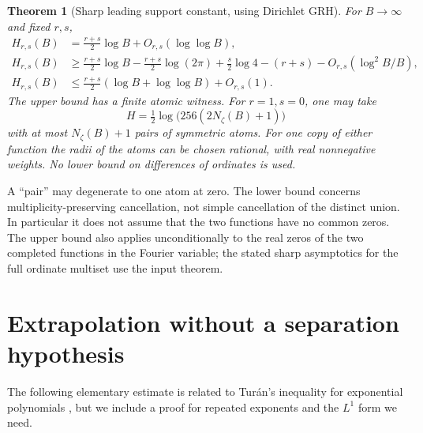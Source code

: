 \documentclass[11pt]{article}
\newtheorem{theorem}{Theorem}[section]
\theoremstyle{remark}\newtheorem{remark}[theorem]{Remark}
\begin{document}
\begin{theorem}[Sharp leading support constant, using Dirichlet GRH]\label{thm:main}
For $B\to\infty$ and fixed $r,s$,
\begin{align*}
 H_{r,s}(B)&=\frac{r+s}{2}\log B+O_{r,s}(\log\log B),\\
 H_{r,s}(B)&\ge \frac{r+s}{2}\log B-\frac{r+s}{2}\log(2\pi)
 +\frac{s}{2}\log4-(r+s)-O_{r,s}(\log^2 B/B),\\
 H_{r,s}(B)&\le\frac{r+s}{2}(\log B+\log\log B)+O_{r,s}(1).
\end{align*}
The upper bound has a finite atomic witness. For $r=1,s=0$, one may take
\begin{equation}\label{eq:explicit}
 H=\tfrac12\log\bigl(256(2N_\zeta(B)+1)\bigr)
\end{equation}
with at most $N_\zeta(B)+1$ pairs of symmetric atoms. For one copy of either function the radii of the atoms can be chosen rational, with real nonnegative weights. No lower bound on differences of ordinates is used.
\end{theorem}
A ``pair'' may degenerate to one atom at zero. The lower bound concerns multiplicity-preserving cancellation, not simple cancellation of the distinct union. In particular it does not assume that the two functions have no common zeros. The upper bound also applies unconditionally to the real zeros of the two completed functions in the Fourier variable; the stated sharp asymptotics for the full ordinate multiset use the input theorem.

\section{Extrapolation without a separation hypothesis}
The following elementary estimate is related to Tur\'an's inequality for exponential polynomials \cite{nazarov}, but we include a proof for repeated exponents and the $L^1$ form we need.
\end{document}
